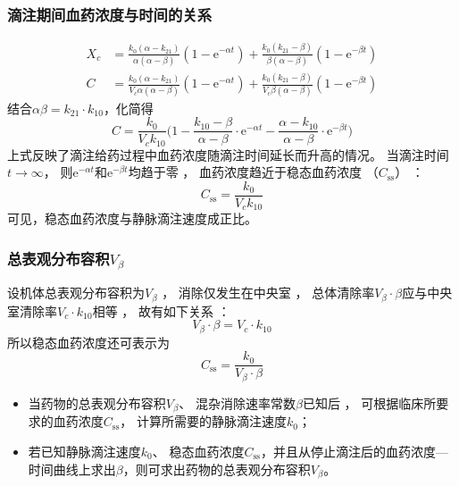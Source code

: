 \documentclass[dvipsnames, svgnames, x11names]{beamer}
\begin{document}
\begin{frame}
    \frametitle{滴注期间血药浓度与时间的关系}
    \[
        \begin{aligned}
            X_{c}& = \frac{k_{0}(\alpha - k_{21})}{\alpha(\alpha - \beta)}(1-\mathrm{e}^{-\alpha t}) + \frac{k_{0}(k_{21}- \beta)}{\beta(\alpha - \beta)} (1-\mathrm{e}^{-\beta t}) \\
            C& = \frac{k_{0}(\alpha - k_{21})}{V_{c}\alpha(\alpha - \beta)}(1-\mathrm{e}^{-\alpha t}) + \frac{k_{0}(k_{21}- \beta)}{V_{c}\beta(\alpha - \beta)} (1-\mathrm{e}^{-\beta t})
        \end{aligned}
    \]
    结合$\alpha  \beta = k_{21}\cdot k_{10}$，化简得
    \[
        C=\frac{k_{0}}{V_{c}k_{{10}}}\Big(1-\frac{k_{{10}}-\beta}{\alpha-\beta}\cdot \mathrm{e}^{-\alpha t}-\frac{\alpha-k_{{10}}}{\alpha-\beta} \cdot \mathrm{e}^{-\beta t}\Big)
    \]
    上式反映了滴注给药过程中血药浓度随滴注时间延长而升高的情况。 当滴注时间$t \to \infty$， 则$\mathrm{e}^{-\alpha t}$和$\mathrm{e}^{-\beta t}$均趋于零 ， 血药浓度趋近于稳态血药浓度 （$C_\mathrm{ss}$） ：
    \[
        C_\mathrm{ss} = \frac{k_0}{V_{c}k_{10}}
    \]
    可见，稳态血药浓度与静脉滴注速度成正比。
\end{frame}


\begin{frame}
    \frametitle{总表观分布容积$V_\beta$}
    设机体总表观分布容积为$V_\beta$ ， 消除仅发生在中央室 ， 总体清除率$V_\beta \cdot \beta$应与中央室清除率$V_{c}\cdot k_{10}$相等 ， 故有如下关系 ：
    \[
        V_\beta \cdot \beta = V_{c}\cdot k_{10}
    \]
    所以稳态血药浓度还可表示为
    \[
        C_\mathrm{ss} = \frac{k_0}{V_\beta \cdot \beta}
    \]
    \begin{itemize}
      \item 当药物的总表观分布容积$V_\beta$、 混杂消除速率常数$\beta$已知后 ， 可根据临床所要求的血药浓度$C_\mathrm{ss}$， 计算所需要的静脉滴注速度$k_{0}$；
      \item 若已知静脉滴注速度$k_{0}$、 稳态血药浓度$C_\mathrm{ss}$，并且从停止滴注后的血药浓度---时间曲线上求出$\beta$，则可求出药物的总表观分布容积$V_\beta$。
    \end{itemize}
\end{frame}
\end{document}
